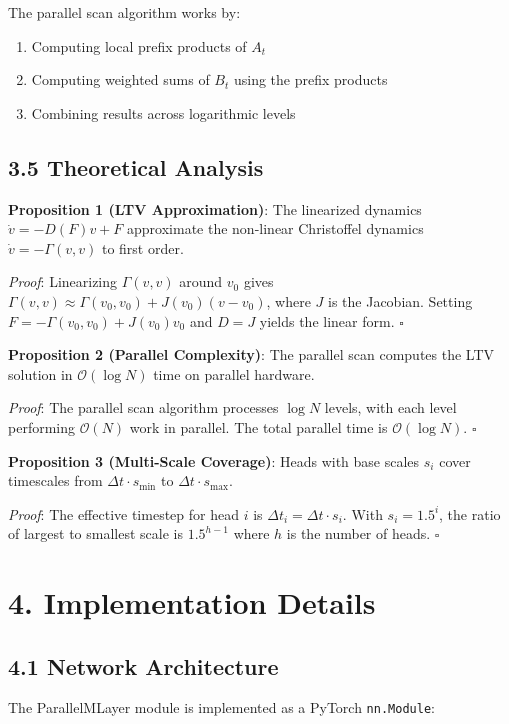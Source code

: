 \documentclass[12pt]{article}
\begin{document}
The parallel scan algorithm works by:
\begin{enumerate}
\item Computing local prefix products of $A_t$
\item Computing weighted sums of $B_t$ using the prefix products
\item Combining results across logarithmic levels
\end{enumerate}

\subsection{3.5 Theoretical Analysis}

\textbf{Proposition 1 (LTV Approximation)}: The linearized dynamics $\dot{v} = -D(F)v + F$ approximate the non-linear Christoffel dynamics $\dot{v} = -\Gamma(v, v)$ to first order.

\textit{Proof}: Linearizing $\Gamma(v, v)$ around $v_0$ gives $\Gamma(v, v) \approx \Gamma(v_0, v_0) + J(v_0)(v - v_0)$, where $J$ is the Jacobian. Setting $F = -\Gamma(v_0, v_0) + J(v_0)v_0$ and $D = J$ yields the linear form. $\square$

\textbf{Proposition 2 (Parallel Complexity)}: The parallel scan computes the LTV solution in $\mathcal{O}(\log N)$ time on parallel hardware.

\textit{Proof}: The parallel scan algorithm processes $\log N$ levels, with each level performing $\mathcal{O}(N)$ work in parallel. The total parallel time is $\mathcal{O}(\log N)$. $\square$

\textbf{Proposition 3 (Multi-Scale Coverage)}: Heads with base scales $s_i$ cover timescales from $\Delta t \cdot s_{\min}$ to $\Delta t \cdot s_{\max}$.

\textit{Proof}: The effective timestep for head $i$ is $\Delta t_i = \Delta t \cdot s_i$. With $s_i = 1.5^i$, the ratio of largest to smallest scale is $1.5^{h-1}$ where $h$ is the number of heads. $\square$

\section{4. Implementation Details}

\subsection{4.1 Network Architecture}

The ParallelMLayer module is implemented as a PyTorch \texttt{nn.Module}:
\end{document}
